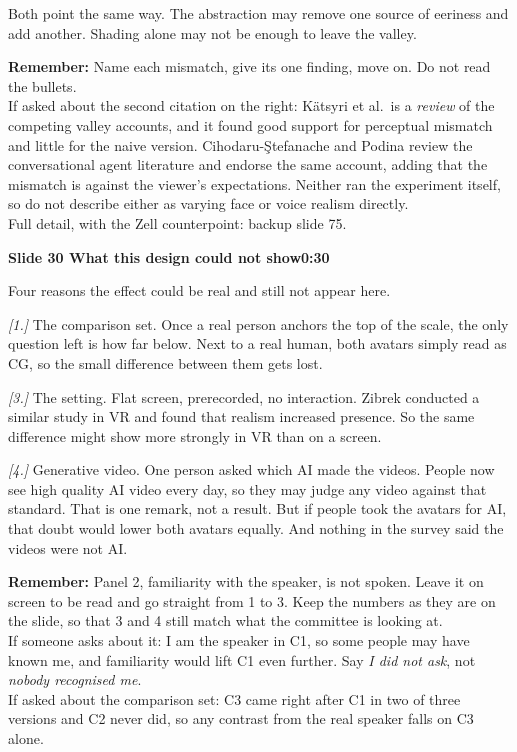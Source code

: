 \documentclass[11pt,a4paper]{article}
\newcommand{\slidehead}[3]{%
  \needspace{5\baselineskip}
  \vspace{0.9em}
  \noindent\colorbox{knblue}{\parbox{0.978\textwidth}{\vspace{1pt}\color{white}\textbf{Slide #1 \quad #2}\hfill\textbf{#3}\vspace{1pt}}}
  \vspace{0.35em}\par}
\newcommand{\remind}[1]{%
  \vspace{0.15em}
  \noindent\colorbox{knlight}{\parbox{0.972\textwidth}{\small\color{knblue}\textbf{Remember:} #1}}
  \vspace{0.2em}\par}
\newcommand{\pointto}[1]{{\color{knaccent}\textit{[#1]}}}
\begin{document}
Both point the same way. The abstraction may remove one source of eeriness and add another. Shading alone may not be enough to leave the valley.

\remind{Name each mismatch, give its one finding, move on. Do not read the bullets.\\[0.4em] If asked about the second citation on the right: K\"atsyri et al.\ is a \emph{review} of the competing valley accounts, and it found good support for perceptual mismatch and little for the naive version. Cihodaru-\c{S}tefanache and Podina review the conversational agent literature and endorse the same account, adding that the mismatch is against the viewer's expectations. Neither ran the experiment itself, so do not describe either as varying face or voice realism directly.\\[0.4em] Full detail, with the Zell counterpoint: backup slide 75.}

\slidehead{30}{What this design could not show}{0:30}

Four reasons the effect could be real and still not appear here.

\pointto{1.} The comparison set. Once a real person anchors the top of the scale, the only question left is how far below. Next to a real human, both avatars simply read as CG, so the small difference between them gets lost.

\pointto{3.} The setting. Flat screen, prerecorded, no interaction. Zibrek conducted a similar study in VR and found that realism increased presence. So the same difference might show more strongly in VR than on a screen.

\pointto{4.} Generative video. One person asked which AI made the videos. People now see high quality AI video every day, so they may judge any video against that standard. That is one remark, not a result. But if people took the avatars for AI, that doubt would lower both avatars equally. And nothing in the survey said the videos were not AI.

\remind{Panel 2, familiarity with the speaker, is not spoken. Leave it on screen to be read and go straight from 1 to 3. Keep the numbers as they are on the slide, so that 3 and 4 still match what the committee is looking at.\\[0.4em] If someone asks about it: I am the speaker in C1, so some people may have known me, and familiarity would lift C1 even further. Say \emph{I did not ask}, not \emph{nobody recognised me}.\\[0.4em] If asked about the comparison set: C3 came right after C1 in two of three versions and C2 never did, so any contrast from the real speaker falls on C3 alone.}
\end{document}
